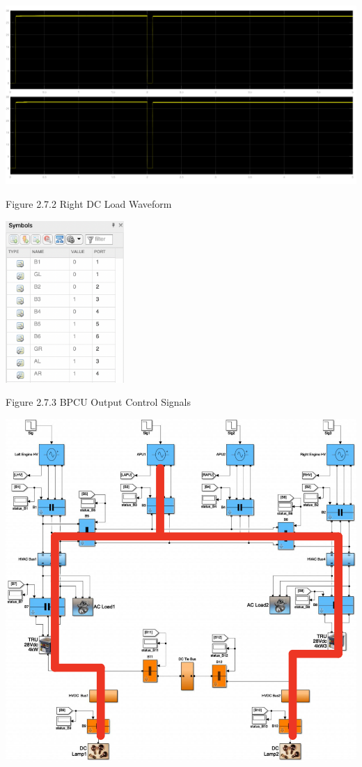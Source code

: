 \documentclass{mcmthesis}
\begin{document}
\includegraphics[trim= 0 0.255\imageheight{} 0 0, clip, width = 0.185\imageheight{}]{gl_gr_load2.png}
\begin{center}
\small{Figure 2.7.2 Right DC Load Waveform}
\end{center}
\begin{center}
\includegraphics[width=4.5cm]{gl_gr_signals.png}
\end{center}
\begin{center}
\small{Figure 2.7.3 BPCU Output Control Signals}
\end{center}
\begin{center}
\includegraphics[width=14.5cm]{gl_gr.png}
\end{center}
\end{document}
